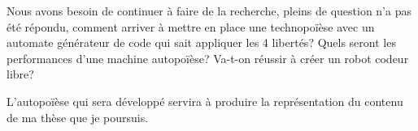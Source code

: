 \label{sec:Conclusion}

Nous avons besoin de continuer à faire de la recherche, pleins de question n'a pas été répondu, comment arriver à mettre en place une technopoïèse avec un automate générateur de code qui sait appliquer les 4 libertés? Quels seront les performances d'une machine autopoïèse? Va-t-on réussir à créer un robot codeur libre?

L'autopoïèse qui sera développé servira à produire la représentation du contenu de ma thèse que je poursuis.



